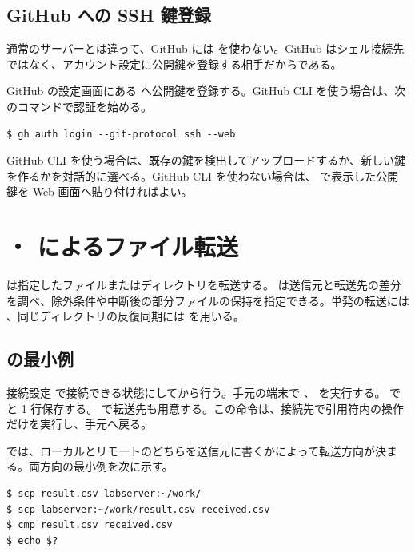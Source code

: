 \subsection{GitHub への SSH 鍵登録}

通常のサーバーとは違って、GitHub には  を使わない。GitHub はシェル接続先ではなく、アカウント設定に公開鍵を登録する相手だからである。

GitHub の設定画面にある  へ公開鍵を登録する。GitHub CLI  を使う場合は、次のコマンドで認証を始める。

\begin{lstlisting}[numbers=none, xleftmargin=2\zw]
$ gh auth login --git-protocol ssh --web
\end{lstlisting}

GitHub CLI を使う場合は、既存の鍵を検出してアップロードするか、新しい鍵を作るかを対話的に選べる。GitHub CLI を使わない場合は、 で表示した公開鍵を Web 画面へ貼り付ければよい。

\section{・ によるファイル転送}

 は指定したファイルまたはディレクトリを転送する。 は送信元と転送先の差分を調べ、除外条件や中断後の部分ファイルの保持を指定できる。単発の転送には 、同じディレクトリの反復同期には  を用いる。

\subsection{ の最小例}

接続設定  で接続できる状態にしてから行う。手元の端末で 、 を実行する。 で  と 1 行保存する。 で転送先も用意する。この命令は、接続先で引用符内の操作だけを実行し、手元へ戻る。

 では、ローカルとリモートのどちらを送信元に書くかによって転送方向が決まる。両方向の最小例を次に示す。

\begin{lstlisting}[numbers=none, xleftmargin=2\zw]
$ scp result.csv labserver:~/work/
$ scp labserver:~/work/result.csv received.csv
$ cmp result.csv received.csv
$ echo $?
\end{lstlisting}

